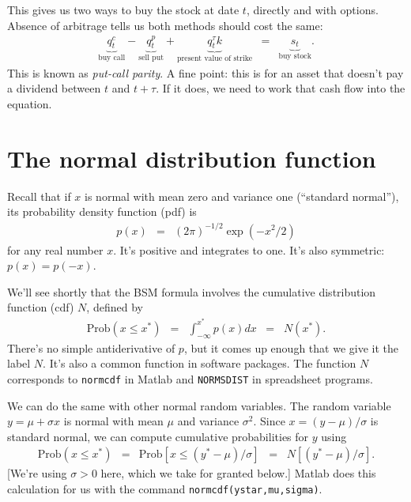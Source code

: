 \documentclass[11pt]{article}
\begin{document}
This gives us two ways to buy the stock at date $t$,
directly and with options.
Absence of arbitrage tells us both methods should cost the same:
\begin{eqnarray}
    \underbrace{q^c_t}_{\mbox{buy call}} -
    \underbrace{q^p_t}_{\mbox{sell put}} +
    \underbrace{q^\tau_t k}_{\mbox{present value of strike}}
    &=&
    \underbrace{s_t}_{\mbox{buy stock}} .
    \label{eq:put-call-parity}
\end{eqnarray}
This is known as {\it put-call parity\/}.
A fine point:  this is for an asset that doesn't pay a dividend
between $t$ and $t+\tau$.
If it does, we need to work that cash flow into the equation.


\section{The normal distribution function}


Recall that if $x$ is normal with mean zero and variance one (``standard normal''),
its probability density function (pdf) is
\begin{eqnarray}
    p(x) &=& (2 \pi)^{-1/2} \exp(-x^2/2)
    \label{eq:pdf-stdnormal}
\end{eqnarray}
for any real number $x$.
It's positive and integrates to one.
It's also symmetric:  $p(x) = p(-x)$.

We'll see shortly that the BSM formula
involves the cumulative distribution function (cdf) $N$,
defined by
\begin{eqnarray*}
    \mbox{Prob} (x \leq x^*)  &=& \int_{-\infty}^{x^*} p(x) dx
        \;\;=\;\; N(x^*).
\end{eqnarray*}
There's no simple antiderivative of $p$, but it comes up enough that
we give it the label $N$.
It's also a common function in software packages.
The function $N$ corresponds to {\tt normcdf} in Matlab
and {\tt NORMSDIST} in spreadsheet programs.

We can do the same with other normal random variables.
The random variable $ y = \mu + \sigma x$
is normal with mean $\mu$ and variance $\sigma^2$.
Since $ x = (y-\mu)/\sigma$ is standard normal,
we can compute cumulative probabilities for $y$ using
\begin{eqnarray*}
    \mbox{Prob} (x \leq x^*)  &=& \mbox{Prob} [x \leq (y^*-\mu)/\sigma ]
        \;\;=\;\; N\left[ (y^*-\mu)/\sigma \right].
\end{eqnarray*}
[We're using $\sigma > 0$ here, which we take for granted below.]
Matlab does this calculation for us with the command {\tt normcdf(ystar,mu,sigma)}.
\end{document}
